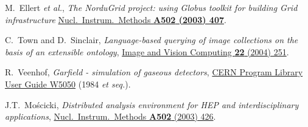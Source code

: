 \documentclass{elsart}
\def\etal {\textit{et al.}}
\begin{document}
\begin{thebibliography}{00}
 M.~Ellert \etal,
\textit{The NorduGrid project: using Globus toolkit for building Grid
infrastructure}
\href{http://dx.doi.org/10.1016/S0168-9002(03)00453-4}
{Nucl.\ Instrum.\ Methods \bf{A502} (2003) 407}.



 C.~Town and D.~Sinclair,
\textit{Language-based querying of image collections on the basis of an
extensible ontology},
\href{http://dx.doi.org/10.1016/j.imavis.2003.10.002}
{Image and Vision Computing \textbf{22} (2004) 251}.

 R.~Veenhof,
\textit{Garfield - simulation of gaseous detectors},
\href{http://consult.cern.ch/writeup/garfield/}
{CERN Program Library User Guide W5050} (1984 \textit{et seq.}).

 J.T.~Mo\'scicki,
\textit{Distributed analysis environment for HEP and interdisciplinary
applications},
\href{http://dx.doi.org/10.1016/S0168-9002(03)00459-5}
{Nucl.\ Instrum.\ Methods \textbf{A502} (2003) 426}.


\end{thebibliography}
\end{document}
